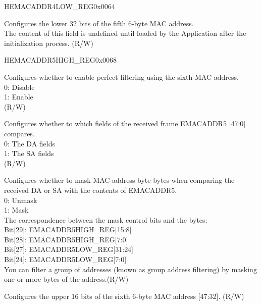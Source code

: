 \begin{register}{H}{EMACADDR4LOW\_REG}{0x0064}\label{regdesc:EMACADDR4LOWREG}
%
\regnewline%
\begin{regdesc}\begin{reglist}
\item [EMACADDR4LOW\_REG] Configures the lower 32 bits of the fifth 6-byte MAC address.\\The content of this field is undefined until loaded by the Application after the initialization process. (R/W)
\end{reglist}\end{regdesc}
\end{register}

\begin{register}{H}{EMACADDR5HIGH\_REG}{0x0068}\label{regdesc:EMACADDR5HIGHREG}
%
%
%
%
%
\regnewline%
\begin{regdesc}\begin{reglist}
\item [ADDRESS\_ENABLE5] Configures whether to enable perfect filtering using the sixth MAC address.\\
0: Disable\\
1: Enable\\ (R/W)
\item [SOURCE\_ADDRESS5] Configures whether to which fields of the received frame EMACADDR5 [47:0] compares.\\
0: The DA fields\\
1: The SA fields\\ (R/W)
\item [MASK\_BYTE\_CONTROL5] Configures whether to mask MAC address byte bytes when comparing the received DA or SA with the contents of EMACADDR5.\\
0: Unmask\\
1: Mask\\
The correspondence between the mask control bits and the bytes:\\
Bit[29]: EMACADDR5HIGH\_REG[15:8]\\
Bit[28]: EMACADDR5HIGH\_REG[7:0]\\
Bit[27]: EMACADDR5LOW\_REG[31:24]\\
Bit[24]: EMACADDR5LOW\_REG[7:0]\\
You can filter a group of addresses (known as group address filtering) by masking one or more bytes of the address.(R/W)
\item [MAC\_ADDRESS5\_HI] Configures the upper 16 bits of the sixth 6-byte MAC address [47:32]. (R/W)
\end{reglist}\end{regdesc}
\end{register}


